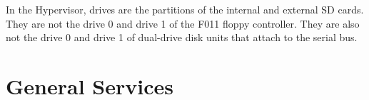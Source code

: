 In the Hypervisor, drives are the partitions of the internal and external SD
cards. They are not the drive 0 and drive 1 of the F011 floppy controller. They
are also not the drive 0 and drive 1 of dual-drive disk units that attach to the
serial bus.



\newpage
\section{General Services}

